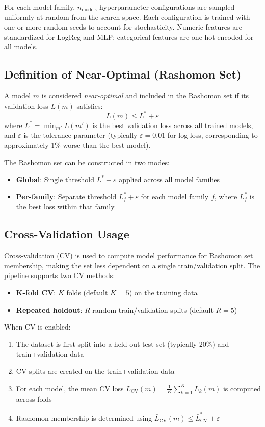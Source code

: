 For each model family, $n_{\text{models}}$ hyperparameter configurations are sampled uniformly at random from the search space. Each configuration is trained with one or more random seeds to account for stochasticity. Numeric features are standardized for LogReg and MLP; categorical features are one-hot encoded for all models.

\subsection{Definition of Near-Optimal (Rashomon Set)}

A model $m$ is considered \emph{near-optimal} and included in the Rashomon set if its validation loss $L(m)$ satisfies:
\begin{equation}
L(m) \leq L^* + \varepsilon
\end{equation}
where $L^* = \min_{m'} L(m')$ is the best validation loss across all trained models, and $\varepsilon$ is the tolerance parameter (typically $\varepsilon = 0.01$ for log loss, corresponding to approximately 1\% worse than the best model).

The Rashomon set can be constructed in two modes:
\begin{itemize}
    \item \textbf{Global}: Single threshold $L^* + \varepsilon$ applied across all model families
    \item \textbf{Per-family}: Separate threshold $L^*_f + \varepsilon$ for each model family $f$, where $L^*_f$ is the best loss within that family
\end{itemize}

\subsection{Cross-Validation Usage}

Cross-validation (CV) is used to compute model performance for Rashomon set membership, making the set less dependent on a single train/validation split. The pipeline supports two CV methods:

\begin{itemize}
    \item \textbf{K-fold CV}: $K$ folds (default $K=5$) on the training data
    \item \textbf{Repeated holdout}: $R$ random train/validation splits (default $R=5$)
\end{itemize}

When CV is enabled:
\begin{enumerate}
    \item The dataset is first split into a held-out test set (typically 20\%) and train+validation data
    \item CV splits are created on the train+validation data
    \item For each model, the mean CV loss $\bar{L}_{\text{CV}}(m) = \frac{1}{K} \sum_{k=1}^K L_k(m)$ is computed across folds
    \item Rashomon membership is determined using $\bar{L}_{\text{CV}}(m) \leq \bar{L}^*_{\text{CV}} + \varepsilon$
\end{enumerate}

